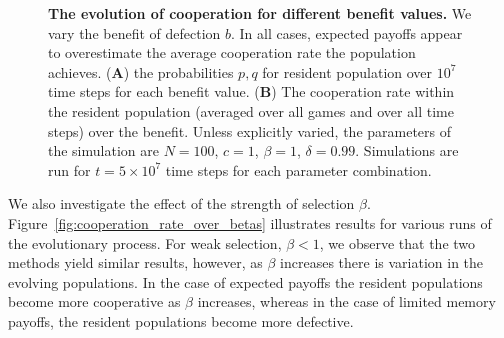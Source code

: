 \documentclass[11pt]{article}
\theoremstyle{plainCl1}
\theoremstyle{plainCl2}
\begin{document}
\begin{figure}[!htbp]
\begin{subfigure}{.5\textwidth}
  \end{subfigure}
  \caption{{\bf The evolution of cooperation for different benefit values.} 
  We vary the benefit of defection $b$. In all cases, expected payoffs appear to
  overestimate the average cooperation rate the population achieves. ({\bf A})
  the probabilities \(p, q\) for resident population over \(10^7\) time steps
  for each benefit value. ({\bf B}) The cooperation rate within the resident population
  (averaged over all games and over all time steps) over the benefit.
  Unless
  explicitly varied, the parameters of the simulation are $N\!=\!100$,
  $c\!=\!1$, $\beta\!=\!1$, $\delta\!=\!0.99$. Simulations are run
  for $t\!=\!5\times 10^7$ time steps for each parameter
  combination.}\label{fig:cooperation_rate_over_benefit}
\end{figure}

We also investigate the effect of the strength of selection $\beta$.
Figure~\ref{fig:cooperation_rate_over_betas} illustrates results for various
runs of the evolutionary process. For weak selection, \(\beta < 1\), we observe
that the two methods yield similar results, however, as \(\beta\) increases
there is variation in the evolving populations. In the case of expected payoffs
the resident populations become more cooperative as \(\beta\)
increases, whereas in the case of limited memory payoffs, the resident
populations become more defective.
\end{document}
